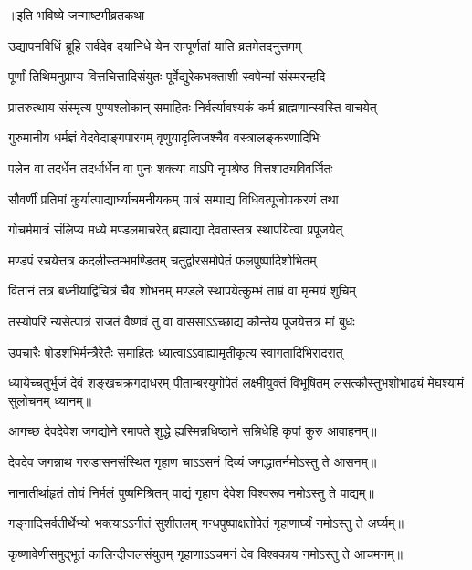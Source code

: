 \centerline{॥इति भविष्ये जन्माष्टमीव्रतकथा}



\twolineshloka
{उद्यापनविधिं ब्रूहि सर्वदेव दयानिधे}
{येन सम्पूर्णतां याति व्रतमेतदनुत्तमम्}

\twolineshloka
{पूर्णां तिथिमनुप्राप्य वित्तचित्तादिसंयुतः}
{पूर्वेद्युरेकभक्ताशी स्वपेन्मां संस्मरन्हदि}

\twolineshloka
{प्रातरुत्थाय संस्मृत्य पुण्यश्लोकान् समाहितः}
{निर्वर्त्यावश्यकं कर्म ब्राह्मणान्स्वस्ति वाचयेत्}

\twolineshloka
{गुरुमानीय धर्मज्ञं वेदवेदाङ्गपारगम्}
{वृणुयादृत्विजश्चैव वस्त्रालङ्करणादिभिः}

\twolineshloka
{पलेन वा तदर्धेन तदर्धार्धेन वा पुनः}
{शक्त्या वाऽपि नृपश्रेष्ठ वित्तशाठ्यविवर्जितः}

\twolineshloka
{सौवर्णीं प्रतिमां कुर्यात्पाद्यार्घ्याचमनीयकम्}
{पात्रं सम्पाद्य विधिवत्पूजोपकरणं तथा}

\twolineshloka
{गोचर्ममात्रं संलिप्य मध्ये मण्डलमाचरेत्}
{ब्रह्माद्या देवतास्तत्र स्थापयित्वा प्रपूजयेत्}

\twolineshloka
{मण्डपं रचयेत्तत्र कदलीस्तम्भमण्डितम्}
{चतुर्द्वारसमोपेतं फलपुष्पादिशोभितम्}

\twolineshloka
{वितानं तत्र बध्नीयाद्विचित्रं चैव शोभनम्}
{मण्डले स्थापयेत्कुम्भं ताम्रं वा मृन्मयं शुचिम्}

\twolineshloka
{तस्योपरि न्यसेत्पात्रं राजतं वैष्णवं तु वा}
{वाससाऽऽच्छाद्य कौन्तेय पूजयेत्तत्र मां बुधः}

\twolineshloka
{उपचारैः षोडशभिर्मन्त्रैरेतैः समाहितः}
{ध्यात्वाऽऽवाह्यामृतीकृत्य स्वागतादिभिरादरात्}

\threelineshloka
{ध्यायेच्चतुर्भुजं देवं शङ्खचक्रगदाधरम्}
{पीताम्बरयुगोपेतं लक्ष्मीयुक्तं विभूषितम्}
{लसत्कौस्तुभशोभाढ्यं मेघश्यामं सुलोचनम्}
ध्यानम्॥

\twolineshloka
{आगच्छ देवदेवेश जगद्योने रमापते}
{शुद्धे ह्यस्मिन्नधिष्ठाने सन्निधेहि कृपां कुरु}
आवाहनम्॥

\twolineshloka
{देवदेव जगन्नाथ गरुडासनसंस्थित}
{गृहाण चाऽऽसनं दिव्यं जगद्धातर्नमोऽस्तु ते}
आसनम्॥

\twolineshloka
{नानातीर्थाहृतं तोयं निर्मलं पुष्षमिश्रितम्}
{पाद्यं गृहाण देवेश विश्वरूप नमोऽस्तु ते}
पाद्यम्॥

\twolineshloka
{गङ्गादिसर्वतीर्थेभ्यो भक्त्याऽऽनीतं सुशीतलम्}
{गन्धपुष्पाक्षतोपेतं गृहाणार्घ्यं नमोऽस्तु ते}
अर्घ्यम्॥

\twolineshloka
{कृष्णावेणीसमुद्भूतं कालिन्दीजलसंयुतम्}
{गृहाणाऽऽचमनं देव विश्वकाय नमोऽस्तु ते}
आचमनम्॥

